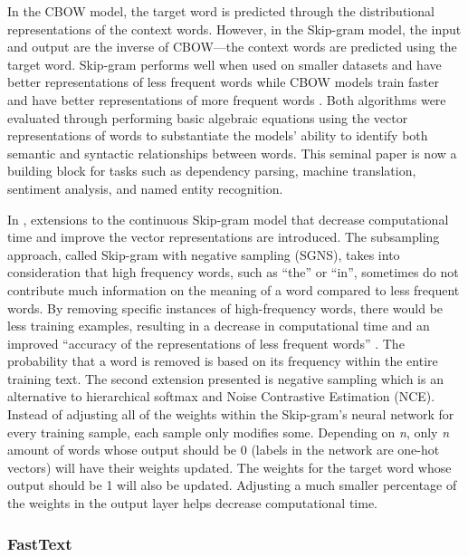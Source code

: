 In the CBOW model, the target word is predicted through the distributional representations of the context words. However, in the Skip-gram model, the input and output are the inverse of CBOW—the context words are predicted using the target word.  Skip-gram performs well when used on smaller datasets and have better representations of less frequent words while CBOW models train faster and have better representations of more frequent words \citep{mikolov2013efficient}. Both algorithms were evaluated through performing basic algebraic equations using the vector representations of words to substantiate the models’ ability to identify both semantic and syntactic relationships between words. This seminal paper is now a building block for tasks such as dependency parsing, machine translation, sentiment analysis, and named entity recognition.


In \citet{mikolov2013distributed}, extensions to the continuous Skip-gram model that decrease computational time and improve the vector representations are introduced. The subsampling approach, called Skip-gram with negative sampling (SGNS), takes into consideration that high frequency words, such as “the” or “in”, sometimes do not contribute much information on the meaning of a word compared to less frequent words. By removing specific instances of high-frequency words, there would be less training examples, resulting in a decrease in computational time and an improved “accuracy of the representations of less frequent words” \citep{mikolov2013distributed}. The probability that a word is removed is based on its frequency within the entire training text. The second extension presented is negative sampling which is an alternative to hierarchical softmax and Noise Contrastive Estimation (NCE). Instead of adjusting all of the weights within the Skip-gram’s neural network for every training sample, each sample only modifies some. Depending on \emph{n}, only \emph{n} amount of words whose output should be 0 (labels in the network are one-hot vectors) will have their weights updated. The weights for the target word whose output should be 1 will also be updated. Adjusting a much smaller percentage of the weights in the output layer helps decrease computational time.


\subsubsection{FastText}


